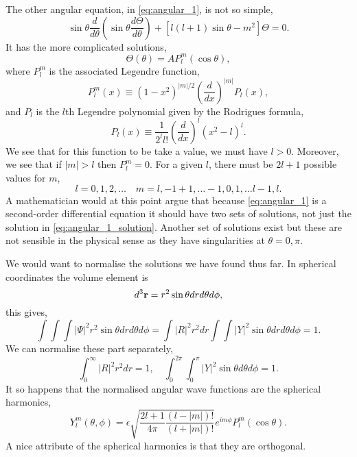 The other angular equation, in \autoref{eq:angular_1}, is not so simple,
\begin{equation}
    \sin\theta\frac{d}{d\theta}\left(\sin\theta\frac{d\Theta}{d\theta} \right)
    + \left[l(l + 1)\sin\theta - m^2 \right]\Theta = 0.
\end{equation}
It has the more complicated solutions,
\begin{equation}
    \label{eq:angular_1_solution}
    \Theta(\theta) = A P^m_l(\cos\theta),
\end{equation}
where $P^m_l$ is the associated Legendre function,
\begin{equation}
    P^m_l(x) \equiv (1-x^2)^{|m|/2} \left(\frac{d}{dx}\right)^{|m|}P_l(x),
\end{equation}
and $P_l$ is the $l$th Legendre polynomial given by the Rodrigues formula,
\begin{equation}
    P_l(x) \equiv \frac{1}{2^l l!}\left(\frac{d}{dx} \right)^l(x^2 - l)^l.
\end{equation}
We see that for this function to be take a value, we must have $l > 0$. Moreover, 
we see that if $|m| > l$ then $P^m_l = 0$. For a given $l$, there must be 
$2l + 1$ possible values for $m$,
\begin{equation*}
    l = 0, 1, 2, \dots \quad m = l, -1 + 1, \dots - 1, 0, 1, \dots l-1, l.
\end{equation*}
A mathematician would at this point argue that because \autoref{eq:angular_1} is 
a second-order differential equation it should have two sets of solutions, not 
just the solution in \autoref{eq:angular_1_solution}. Another set of solutions 
exist but these are not sensible in the physical sense as they have singularities 
at $\theta=0, \pi$.

We would want to normalise the solutions we have found thus far. In spherical 
coordinates the volume element is 
\begin{equation}
    d^3\vb{r} = r^2 \sin\theta dr d\theta d\phi,
\end{equation}
this gives,
\begin{equation}
    \int\int\int |\Psi|^2 r^2\sin\theta dr d\theta d\phi
    = \int |R|^2r^2 dr \int\int|Y|^2\sin\theta dr d\theta d\phi = 1.
\end{equation}
We can normalise these part separately,
\begin{equation}
    \int_0^\infty |R|^2 r^2 dr = 1, \quad 
    \int_0^{2\pi}\int_0^\pi |Y|^2 \sin\theta d\theta d\phi = 1.
\end{equation}
It so happens that the normalised angular wave functions are the 
spherical harmonics,
\begin{equation}
    \label{eq:spherical_harmonics_app}
    Y^m_l(\theta, \phi) 
    =
    \epsilon\sqrt{\frac{2l + 1}{4\pi}\frac{(l - |m|)!}{(l + |m|)!}}
    e^{im\phi} P^m_l(\cos\theta).
\end{equation}
A nice attribute of the spherical harmonics is that they are orthogonal.

